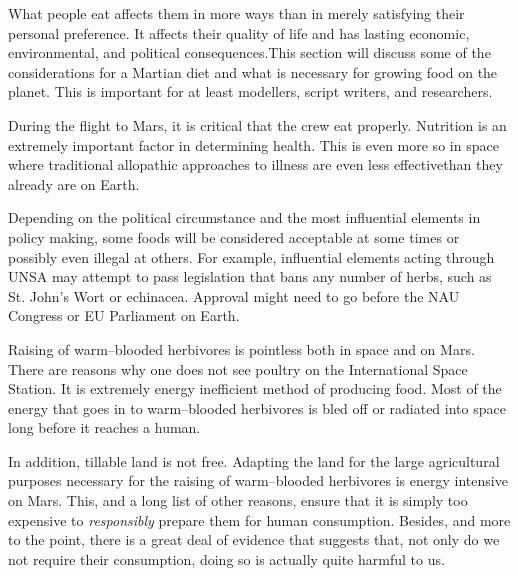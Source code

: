 

What people eat affects them in more ways than in merely satisfying their personal preference. It affects their quality of life and has lasting economic, environmental, and political consequences. This section will discuss some of the considerations for a Martian diet and what is necessary for growing food on the planet. This is important for at least modellers, script writers, and researchers.

During the flight to Mars, it is critical that the crew eat properly. Nutrition is an extremely important factor in determining health. This is even more so in space where traditional allopathic approaches to illness are even less effective than they already are on Earth.

Depending on the political circumstance and the most influential elements in policy making, some foods will be considered acceptable at some times or possibly even illegal at others. For example, influential elements acting through UNSA may attempt to pass legislation that bans any number of herbs, such as St. John’s Wort or echinacea. Approval might need to go before the NAU Congress or EU Parliament on Earth.

Raising of warm--blooded herbivores is pointless both in space and on Mars. There are reasons why one does not see poultry on the International Space Station. It is extremely energy inefficient method of producing food. Most of the energy that goes in to warm--blooded herbivores is bled off or radiated into space long before it reaches a human. 

In addition, tillable land is not free. Adapting the land for the large agricultural purposes necessary for the raising of warm--blooded herbivores is energy intensive on Mars. This, and a long list of other reasons, ensure that it is simply too expensive to {\it responsibly} prepare them for human consumption. Besides, and more to the point, there is a great deal of evidence that suggests that, not only do we not require their consumption, doing so is actually quite harmful to us.

